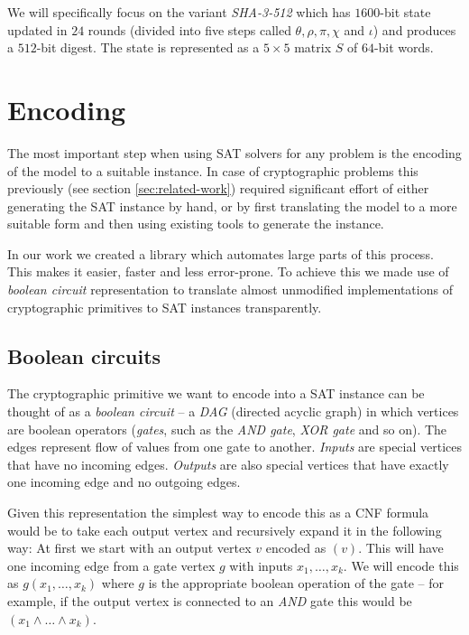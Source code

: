 We will specifically focus on the variant \emph{SHA-3-512} which has $1600$-bit state updated in $24$ rounds (divided into five steps called $\theta, \rho, \pi, \chi$ and $\iota$) and produces a $512$-bit digest.
The state is represented as a $5\times 5$ matrix $S$ of $64$-bit words.

\section{Encoding}
The most important step when using SAT solvers for any problem is the encoding of the model to a suitable instance.
In case of cryptographic problems this previously (see section \ref{sec:related-work}) required significant effort of either generating the SAT instance by hand, or by first translating the model to a more suitable form and then using existing tools to generate the instance.

In our work we created a library \cite{papay2016code} which automates large parts of this process.
This makes it easier, faster and less error-prone.
To achieve this we made use of \emph{boolean circuit} representation to translate almost unmodified implementations of cryptographic primitives to SAT instances transparently.

\subsection{Boolean circuits}
The cryptographic primitive we want to encode into a SAT instance can be thought of as a \emph{boolean circuit} -- a \emph{DAG} (directed acyclic graph) in which vertices are boolean operators (\emph{gates}, such as the \emph{AND gate}, \emph{XOR gate} and so on).
The edges represent flow of values from one gate to another.
\emph{Inputs} are special vertices that have no incoming edges.
\emph{Outputs} are also special vertices that have exactly one incoming edge and no outgoing edges.

Given this representation the simplest way to encode this as a CNF formula would be to take each output vertex and recursively expand it in the following way:
At first we start with an output vertex $v$ encoded as $(v)$.
This will have one incoming edge from a gate vertex $g$ with inputs $x_1, \dots, x_k$.
We will encode this as $g(x_1, \dots, x_k)$ where $g$ is the appropriate boolean operation of the gate -- for example, if the output vertex is connected to an \emph{AND} gate this would be $(x_1 \land \dots \land x_k)$.

